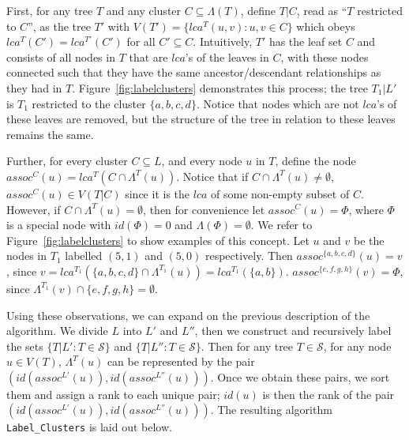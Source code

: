 \documentclass{article}
\newcommand{\leafset}{\Lambda}
\begin{document}
    First, for any tree $T$ and any cluster $C \subseteq \leafset(T)$, define $T|C$, read as ``$T$ restricted to $C$'', as the tree $T'$ with $V(T') = \{lca^T(u, v) : u, v \in C\}$ which obeys $lca^T(C') = lca^{T'}(C')$ for all $C' \subseteq C$. Intuitively, $T'$ has the leaf set $C$ and consists of all nodes in $T$ that are $lca$'s of the leaves in $C$, with these nodes connected such that they have the same ancestor/descendant relationships as they had in $T$. Figure~\ref{fig:labelclusters} demonstrates this process; the tree $T_1|L'$ is $T_1$ restricted to the cluster $\{a, b, c, d\}$. Notice that nodes which are not $lca$'s of these leaves are removed, but the structure of the tree in relation to these leaves remains the same.

    Further, for every cluster $C \subseteq L$, and every node $u$ in $T$, define the node $assoc^C(u) = lca^T(C \cap \leafset^T(u))$. Notice that if $C \cap \leafset^T(u) \neq \emptyset$, $assoc^C(u) \in V(T|C)$ since it is the $lca$ of some non-empty subset of $C$. However, if $C \cap \leafset^T(u) = \emptyset$, then for convenience let $assoc^{C}(u) = \Phi$, where $\Phi$ is a special node with $id(\Phi) = 0$ and $\leafset(\Phi) = \emptyset$. We refer to Figure~\ref{fig:labelclusters} to show examples of this concept. Let $u$ and $v$ be the nodes in $T_1$ labelled $(5, 1)$ and $(5, 0)$ respectively. Then $assoc^{\{a, b, c, d\}}(u) = v$, since $v = lca^{T_1}(\{a, b, c, d\} \cap \leafset^{T_1}(u)) = lca^{T_1}(\{a, b\})$. $assoc^{\{e, f, g, h\}}(v) = \Phi$, since $\leafset^{T_1}(v) \cap \{e, f, g, h\} = \emptyset$.

    Using these observations, we can expand on the previous description of the algorithm. We divide $L$ into $L'$ and $L''$, then we construct and recursively label the sets $\{T|L' : T \in \mathcal{S}\}$ and $\{T|L'' : T \in \mathcal{S}\}$. Then for any tree $T \in \mathcal{S}$, for any node $u \in V(T)$, $\leafset^T(u)$ can be represented by the pair $(id(assoc^{L'}(u)), id(assoc^{L''}(u)))$. Once we obtain these pairs, we sort them and assign a rank to each unique pair; $id(u)$ is then the rank of the pair $(id(assoc^{L'}(u)), id(assoc^{L''}(u)))$. The resulting algorithm \texttt{Label\_Clusters} is laid out below.
\end{document}
